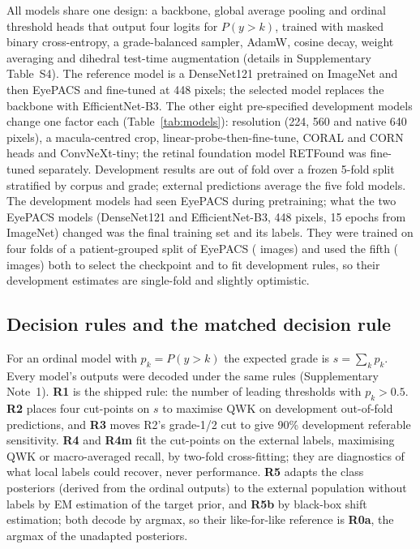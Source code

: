 All models share one design: a backbone, global average pooling and ordinal threshold heads
that output four logits for $P(y>k)$\cite{cao2020rank}, trained with masked binary
cross-entropy, a grade-balanced sampler, AdamW, cosine decay, weight averaging and
dihedral test-time augmentation (details in Supplementary Table~S4). The reference model is a
DenseNet121\cite{huang2017densenet} pretrained on ImageNet and then EyePACS and fine-tuned at
448 pixels; the selected model replaces the backbone with EfficientNet-B3\cite{tan2019efficientnet}.
The other eight pre-specified development models change one factor each
(Table~\ref{tab:models}): resolution (224, 560 and native 640 pixels), a macula-centred crop,
linear-probe-then-fine-tune\cite{kumar2022lpft}, CORAL and CORN heads\cite{cao2020rank,shi2023corn}
and ConvNeXt-tiny\cite{liu2022convnext}; the retinal foundation model RETFound\cite{zhou2023retfound}
was fine-tuned separately. Development results are out of fold over a frozen 5-fold split
stratified by corpus and grade; external predictions average the five fold models. The development
models had seen EyePACS during pretraining; what the two EyePACS models (DenseNet121 and
EfficientNet-B3, 448 pixels, 15 epochs from ImageNet) changed was the final training set and its
labels. They were trained on four folds of a patient-grouped split of EyePACS
( images) and used the fifth ( images) both to select the
checkpoint and to fit development rules, so their development estimates are single-fold and
slightly optimistic.

\subsection{Decision rules and the matched decision rule}

For an ordinal model with $p_k=P(y>k)$ the expected grade is $s=\sum_k p_k$. Every model's
outputs were decoded under the same rules (Supplementary Note~1). \textbf{R1} is the shipped
rule: the number of leading thresholds with $p_k>0.5$. \textbf{R2} places four cut-points on $s$
to maximise QWK on development out-of-fold predictions, and \textbf{R3} moves R2's grade-1/2
cut to give 90\% development referable sensitivity. \textbf{R4} and \textbf{R4m} fit the
cut-points on the external labels, maximising QWK or macro-averaged recall, by two-fold
cross-fitting; they are diagnostics of what local labels could recover, never performance.
\textbf{R5} adapts the class posteriors (derived from the ordinal outputs) to the external
population without labels by EM estimation of the target prior\cite{saerens2002adjusting},
and \textbf{R5b} by black-box shift estimation\cite{lipton2018bbse}; both decode by argmax, so
their like-for-like reference is \textbf{R0a}, the argmax of the unadapted posteriors.

